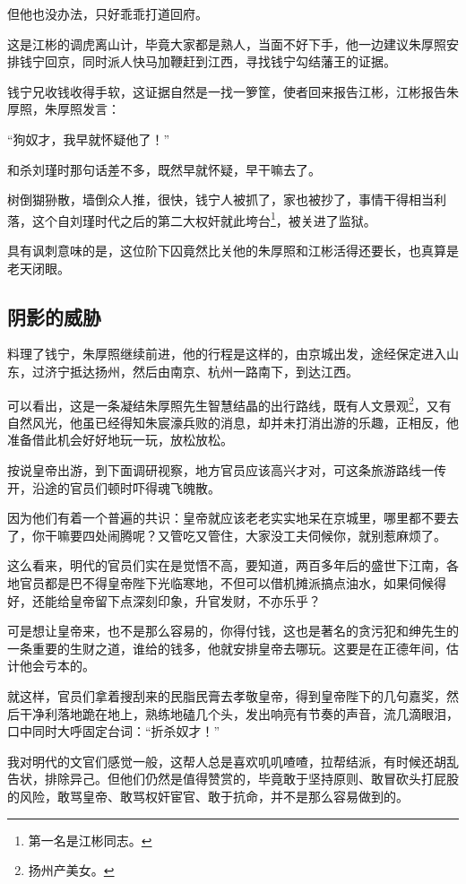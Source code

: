 \begin{multicols}{\theparacolNo}
		但他也没办法，只好乖乖打道回府。

		这是江彬的调虎离山计，毕竟大家都是熟人，当面不好下手，他一边建议朱厚照安排钱宁回京，同时派人快马加鞭赶到江西，寻找钱宁勾结藩王的证据。

		钱宁兄收钱收得手软，这证据自然是一找一箩筐，使者回来报告江彬，江彬报告朱厚照，朱厚照发言：

		“狗奴才，我早就怀疑他了！”

		和杀刘瑾时那句话差不多，既然早就怀疑，早干嘛去了。

		树倒猢狲散，墙倒众人推，很快，钱宁人被抓了，家也被抄了，事情干得相当利落，这个自刘瑾时代之后的第二大权奸就此垮台\footnote{第一名是江彬同志。}，被关进了监狱。

		具有讽刺意味的是，这位阶下囚竟然比关他的朱厚照和江彬活得还要长，也真算是老天闭眼。

		\subsection{阴影的威胁}
		料理了钱宁，朱厚照继续前进，他的行程是这样的，由京城出发，途经保定进入山东，过济宁抵达扬州，然后由南京、杭州一路南下，到达江西。

		可以看出，这是一条凝结朱厚照先生智慧结晶的出行路线，既有人文景观\footnote{扬州产美女。}，又有自然风光，他虽已经得知朱宸濠兵败的消息，却并未打消出游的乐趣，正相反，他准备借此机会好好地玩一玩，放松放松。

		按说皇帝出游，到下面调研视察，地方官员应该高兴才对，可这条旅游路线一传开，沿途的官员们顿时吓得魂飞魄散。

		因为他们有着一个普遍的共识：皇帝就应该老老实实地呆在京城里，哪里都不要去了，你干嘛要四处闹腾呢？又管吃又管住，大家没工夫伺候你，就别惹麻烦了。

		这么看来，明代的官员们实在是觉悟不高，要知道，两百多年后的盛世下江南，各地官员都是巴不得皇帝陛下光临寒地，不但可以借机摊派搞点油水，如果伺候得好，还能给皇帝留下点深刻印象，升官发财，不亦乐乎？

		可是想让皇帝来，也不是那么容易的，你得付钱，这也是著名的贪污犯和绅先生的一条重要的生财之道，谁给的钱多，他就安排皇帝去哪玩。这要是在正德年间，估计他会亏本的。

		就这样，官员们拿着搜刮来的民脂民膏去孝敬皇帝，得到皇帝陛下的几句嘉奖，然后干净利落地跪在地上，熟练地磕几个头，发出响亮有节奏的声音，流几滴眼泪，口中同时大呼固定台词：“折杀奴才！”

		我对明代的文官们感觉一般，这帮人总是喜欢叽叽喳喳，拉帮结派，有时候还胡乱告状，排除异己。但他们仍然是值得赞赏的，毕竟敢于坚持原则、敢冒砍头打屁股的风险，敢骂皇帝、敢骂权奸宦官、敢于抗命，并不是那么容易做到的。


\end{multicols}
